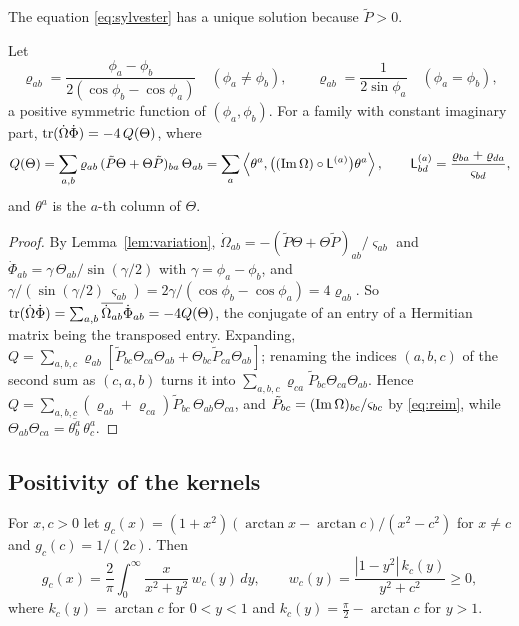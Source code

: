 The equation \eqref{eq:sylvester} has a unique solution because
$\tilde P>0$.

\begin{lemma}\label{lem:form}
Let
\[
 \varrho_{ab}=\frac{\phi_a-\phi_b}{2(\cos\phi_b-\cos\phi_a)}\quad(\phi_a\neq\phi_b),
 \qquad\varrho_{ab}=\frac1{2\sin\phi_a}\quad(\phi_a=\phi_b),
\]
a positive symmetric function of $(\phi_a,\phi_b)$. For a family with
constant imaginary part, $\operatorname{tr}(\dot\Omega\dot\Phi)=-4\,Q(\Theta)$, where
\[
 Q(\Theta)=\sum_{a,b}\varrho_{ab}\,(\tilde P\Theta+\Theta\tilde P)_{ba}\,\Theta_{ab}
 =\sum_a\left\langle\theta^a,\bigl((\operatorname{Im}\Omega)\circ\mathsf L^{(a)}\bigr)\theta^a\right\rangle,\qquad
 \mathsf L^{(a)}_{bd}=\frac{\varrho_{ba}+\varrho_{da}}{\varsigma_{bd}},
\]
and $\theta^a$ is the $a$-th column of $\Theta$.
\end{lemma}

\begin{proof}
By Lemma~\ref{lem:variation},
$\dot\Omega_{ab}=-(\tilde P\Theta+\Theta\tilde P)_{ab}/\varsigma_{ab}$ and
$\dot\Phi_{ab}=\gamma\,\Theta_{ab}/\sin(\gamma/2)$ with
$\gamma=\phi_a-\phi_b$, and
$\gamma/(\sin(\gamma/2)\,\varsigma_{ab})=2\gamma/(\cos\phi_b-\cos\phi_a)=4\varrho_{ab}$.
So
$\operatorname{tr}(\dot\Omega\dot\Phi)=\sum_{a,b}\overline{\dot\Omega_{ab}}\dot\Phi_{ab}=-4Q(\Theta)$,
the conjugate of an entry of a Hermitian matrix being the transposed entry.
Expanding,
$Q=\sum_{a,b,c}\varrho_{ab}[\tilde P_{bc}\Theta_{ca}\Theta_{ab}
+\Theta_{bc}\tilde P_{ca}\Theta_{ab}]$; renaming the indices $(a,b,c)$ of the
second sum as $(c,a,b)$ turns it into
$\sum_{a,b,c}\varrho_{ca}\tilde P_{bc}\Theta_{ca}\Theta_{ab}$. Hence
$Q=\sum_{a,b,c}(\varrho_{ab}+\varrho_{ca})\tilde P_{bc}\,\Theta_{ab}\Theta_{ca}$,
and $\tilde P_{bc}=(\operatorname{Im}\Omega)_{bc}/\varsigma_{bc}$ by \eqref{eq:reim}, while
$\Theta_{ab}\Theta_{ca}=\overline{\theta^a_b}\,\theta^a_c$.
\end{proof}

\subsection{Positivity of the kernels}

\begin{lemma}\label{lem:integral}
For $x,c>0$ let
$g_c(x)=(1+x^2)(\arctan x-\arctan c)/(x^2-c^2)$ for $x\neq c$ and
$g_c(c)=1/(2c)$. Then
\[
 g_c(x)=\frac2\pi\int_0^\infty\frac x{x^2+y^2}\,w_c(y)\,dy,\qquad
 w_c(y)=\frac{|1-y^2|\,k_c(y)}{y^2+c^2}\geq0,
\]
where $k_c(y)=\arctan c$ for $0<y<1$ and $k_c(y)=\frac\pi2-\arctan c$ for
$y>1$.
\end{lemma}

